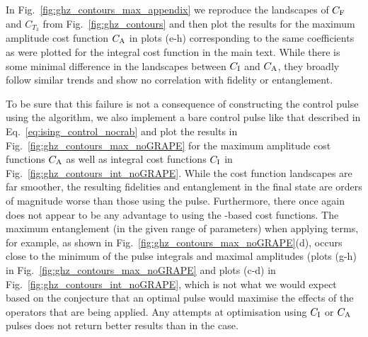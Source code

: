 In Fig.~\ref{fig:ghz_contours_max_appendix} we reproduce the landscapes of $C_{\rm F}$ and $C_{T_3}$ from Fig.~\ref{fig:ghz_contours} and then plot the results for the maximum amplitude cost function $C_{\rm A}$ in plots (e-h) corresponding to the same coefficients as were plotted for the integral cost function in the main text. While there is some minimal difference in the landscapes between $C_{\rm I}$ and $C_{\rm A}$, they broadly follow similar trends and show no correlation with fidelity or entanglement.

To be sure that this failure is not a consequence of constructing the control pulse using the  algorithm, we also implement a bare control pulse like that described in Eq.~\eqref{eq:ising_control_nocrab} and plot the results in Fig.~\ref{fig:ghz_contours_max_noGRAPE} for the maximum amplitude cost functions $C_{\rm A}$ as well as integral cost functions $C_{\rm I}$ in Fig.~\ref{fig:ghz_contours_int_noGRAPE}. While the cost function landscapes are far smoother, the resulting fidelities and entanglement in the final state are orders of magnitude worse than those using the  pulse. Furthermore, there once again does not appear to be any advantage to using the -based cost functions. The maximum entanglement (in the given range of parameters) when applying  terms, for example, as shown in Fig.~\ref{fig:ghz_contours_max_noGRAPE}(d), occurs close to the minimum of the  pulse integrals and maximal amplitudes (plots (g-h) in Fig.~\ref{fig:ghz_contours_max_noGRAPE} and plots (c-d) in Fig.~\ref{fig:ghz_contours_int_noGRAPE}, which is not what we would expect based on the conjecture that an optimal pulse would maximise the effects of the  operators that are being applied. Any attempts at optimisation using $C_{\rm I}$ or $C_{\rm A}$ pulses does not return better results than in the  case.

